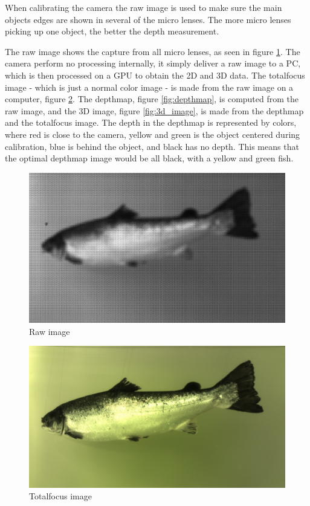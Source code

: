When calibrating the camera the raw image is used to make sure the main objects edges are shown in several of the micro lenses. The more micro lenses picking up one object, the better the depth measurement. 

The raw image shows the capture from all micro lenses, as seen in figure \ref{fig:raw_image}. The camera perform no processing internally, it simply deliver a raw image to a PC, which is then processed on a GPU to obtain the 2D and 3D data. 
The totalfocus image - which is just a normal color image - is made from the raw image on a computer, figure \ref{fig:totalfocus}. 
The depthmap, figure \ref{fig:depthmap}, is computed from the raw image, and the 3D image, figure \ref{fig:3d_image}, is made from the depthmap and the totalfocus image. 
The depth in the depthmap is represented by colors, where red is close to the camera, yellow and green is the object centered during calibration, blue is behind the object, and black has no depth. This means that the optimal depthmap image would be all black, with a yellow and green fish.

\begin{figure}[h]
    \centering
    \includegraphics[width=.9\linewidth]{images/introduction/raw}
    \caption{Raw image}
    \label{fig:raw_image}
\end{figure}

\begin{figure}[h]
    \centering
    \includegraphics[width=.9\linewidth]{images/introduction/totalfocus}
    \caption{Totalfocus image}
    \label{fig:totalfocus}
\end{figure}

